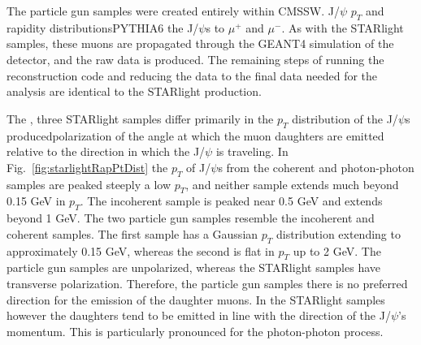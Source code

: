     The particle gun samples were created entirely within CMSSW.
    \DIFdelbegin {}\DIFdelend J/$\psi$ \DIFaddbegin {}\DIFaddend $p_{T}$ and rapidity
      distributions\DIFdelbegin {}\DIFdelend \DIFaddbegin {}\DIFaddend PYTHIA6 \DIFdelbegin {}\DIFdelend \DIFaddbegin {}\DIFaddend the J/$\psi$s to $\mu^{+}$ and $\mu^{-}$.
    As with the STARlight samples, these muons are propagated through the GEANT4
      simulation of the detector, and the raw data is produced.
    The remaining steps of running the reconstruction code and reducing the 
      data to the final data needed for the analysis are identical to the 
      STARlight production.

    The \DIFdelbegin {}\DIFdelend \DIFaddbegin {}\DIFaddend , three STARlight samples \DIFdelbegin {}\DIFdelend differ primarily in the 
      $p_{T}$ distribution \DIFaddbegin {}\DIFaddend of the J/$\psi$s produced\DIFdelbegin {}\DIFdelend \DIFaddbegin {}\DIFaddend polarization of the \DIFdelbegin {}\DIFdelend \DIFaddbegin \JPsi {}\DIFaddend angle at which the muon daughters
      are emitted relative to the direction in which the J/$\psi$ is traveling. 
    In Fig.~\ref{fig:starlightRapPtDist} the $p_{T}$ of J/$\psi$s from the 
      coherent and photon-photon samples are peaked steeply a low $p_{T}$, and 
      neither sample extends much beyond 0.15 GeV in $p_{T}$.
    The incoherent sample is peaked near 0.5 GeV and extends beyond 1 GeV.
    The two particle gun samples resemble the incoherent and coherent samples.
    The first sample has a Gaussian $p_{T}$ distribution extending to 
      approximately 0.15 GeV, whereas the second is flat in $p_{T}$ up to
      2 GeV.
    The particle gun samples are unpolarized, whereas the STARlight samples 
      have transverse polarization. 
    Therefore, the particle gun samples there is no preferred direction for the 
      emission of the daughter muons.
    In the STARlight samples however the daughters tend to be emitted in line
      with the direction of the J/$\psi$'s momentum.
    This is particularly pronounced for the photon-photon process.

